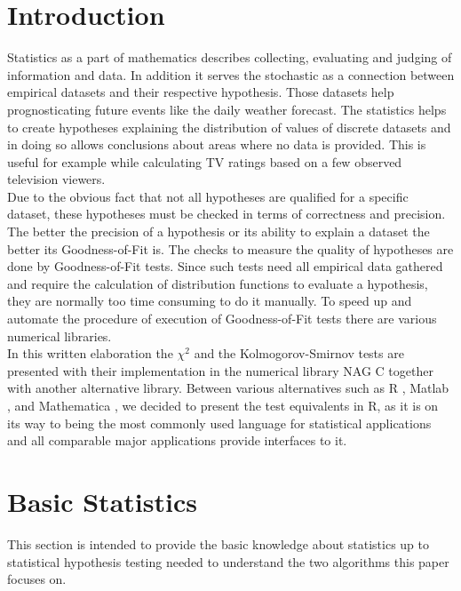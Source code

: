 \documentclass{article}
\theoremstyle{definition}
\begin{document}
\section{Introduction}
Statistics as a part of mathematics describes collecting, evaluating and judging of information and data.
In addition it serves the stochastic as a connection between empirical datasets and their respective hypothesis.
Those datasets help prognosticating future events like the daily weather forecast. 
The statistics helps to create hypotheses explaining the distribution of values of discrete datasets and in doing so allows conclusions about areas where no data is provided.
This is useful for example while calculating TV ratings based on a few observed television viewers.
\\
Due to the obvious fact that not all hypotheses are qualified for a specific dataset, these hypotheses must be checked in terms of correctness and precision.
The better the precision of a hypothesis or its ability to explain a dataset the better its Goodness-of-Fit is.
The checks to measure the quality of hypotheses are done by Goodness-of-Fit tests.
Since such tests need all empirical data gathered and require the calculation of distribution functions to evaluate a hypothesis, they are normally too time consuming to do it manually.
To speed up and automate the procedure of execution of Goodness-of-Fit tests there are various numerical libraries.
\\
In this written elaboration the $\chi^2$ and the Kolmogorov-Smirnov tests are presented with their implementation in the numerical library NAG C together with another alternative library.
Between various alternatives such as R \cite{hellbrueck2009angewandte}, Matlab \cite{benker2001statistik}, and Mathematica \cite{jaeger1997statistik}, we decided to present the test equivalents in R, as it is on its way to being the most commonly used language for statistical applications and all comparable major applications provide interfaces to it.

\section{Basic Statistics}
This section is intended to provide the basic knowledge about statistics up to statistical hypothesis testing needed to understand the two algorithms this paper focuses on.
\end{document}
